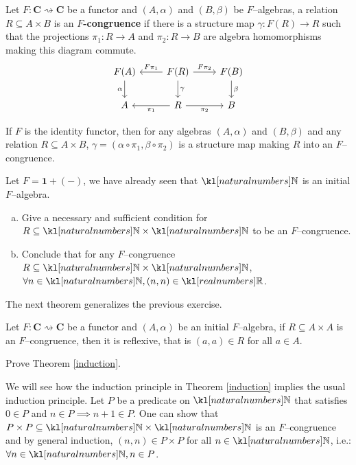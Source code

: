 \documentclass[main.tex]{subfiles}
\begin{document}
\begin{defn}
	Let $F:\mathbf{C}\rightsquigarrow \mathbf{C}$ be a functor and $(A,\alpha)$ and $(B, \beta)$ be $F$--algebras, a relation $R \subseteq A \times B$ is an $F$\textbf{-congruence} if there is a structure map $\gamma:F(R) \rightarrow R$ such that the projections $\pi_1:R\rightarrow A$ and $\pi_2:R \rightarrow B$ are algebra homomorphisms making this diagram commute.
	\begin{equation}\label{diag-congruence}
		\centering
		\begin{tikzcd}
			F(A) \arrow[d, "\alpha"'] & F(R) \arrow[d, "\gamma"] \arrow[l, "F\pi_1"'] \arrow[r, "F\pi_2"] & F(B) \arrow[d, "\beta"] \\
			A                         & R \arrow[r, "\pi_2"'] \arrow[l, "\pi_1"]                          & B                      
		\end{tikzcd}
	\end{equation}
\end{defn}
\begin{exmp}
	If $F$ is the identity functor, then for any algebras $(A, \alpha)$ and $(B, \beta)$ and any relation $R \subseteq A\times B$, $\gamma = (\alpha \circ \pi_1, \beta \circ \pi_2)$ is a structure map making $R$ into an $F$--congruence.
\end{exmp}
\begin{exer}[2pts]
    Let $F = \mathbf{1} + (-)$, we have already seen that $\N$ is an initial $F$--algebra.
    \begin{enumerate}[(a)]
        \item Give a necessary and sufficient condition for $R \subseteq \N \times \N$ to be an $F$--congruence.
        \item Conclude that for any $F$--congruence $R \subseteq \N\times \N$, $\forall n \in \N, (n,n) \in \R$.
    \end{enumerate}
\end{exer}
The next theorem generalizes the previous exercise.
\begin{thm}\label{induction} Let $F:\mathbf{C}\rightsquigarrow \mathbf{C}$ be a functor and $(A, \alpha)$ be an initial $F$--algebra, if $R\subseteq A\times A$ is an $F$--congruence, then it is reflexive, that is $(a,a) \in R$ for all $a \in A$.
\end{thm}
\begin{exer}[1.5pts]
    Prove Theorem \ref{induction}.
\end{exer}
\begin{exmp}[Induction in $\N$]
	We will see how the induction principle in Theorem \ref{induction} implies the usual induction principle. Let $P$ be a predicate on $\N$ that satisfies $0 \in P$ and $n\in P \implies n+1 \in P$. One can show that $P\times P \subseteq \N\times \N$ is an $F$--congruence and by general induction, $(n,n) \in P \times P$ for all $n \in \N$, i.e.: $\forall n\in \N, n \in P$.
\end{exmp}
\end{document}
